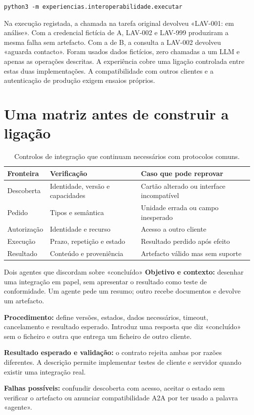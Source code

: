 \begin{lstlisting}
python3 -m experiencias.interoperabilidade.executar
\end{lstlisting}

Na execução registada, a chamada na tarefa original devolveu «LAV-001: em análise». Com a credencial fictícia de A, LAV-002 e LAV-999 produziram a mesma falha sem artefacto. Com a de B, a consulta a LAV-002 devolveu «aguarda contacto». Foram usados dados fictícios, zero chamadas a um LLM e apenas as operações descritas. A experiência cobre uma ligação controlada entre estas duas implementações. A compatibilidade com outros clientes e a autenticação de produção exigem ensaios próprios.

\section{Uma matriz antes de construir a ligação}
\begin{table}[htbp]
\small
\begin{tabularx}{\textwidth}{@{}lXX@{}}
\toprule
Fronteira & Verificação & Caso que pode reprovar \\
\midrule
Descoberta & Identidade, versão e capacidades & Cartão alterado ou interface incompatível \\
Pedido & Tipos e semântica & Unidade errada ou campo inesperado \\
Autorização & Identidade e recurso & Acesso a outro cliente \\
Execução & Prazo, repetição e estado & Resultado perdido após efeito \\
Resultado & Conteúdo e proveniência & Artefacto válido mas sem suporte \\
\bottomrule
\end{tabularx}
\caption{Controlos de integração que continuam necessários com protocolos comuns.}
\end{table}

\begin{promptlabbox}{Dois agentes que discordam sobre «concluído»}
\textbf{Objetivo e contexto:} desenhar uma integração em papel, sem apresentar o resultado como teste de conformidade. Um agente pede um resumo; outro recebe documentos e devolve um artefacto.

\textbf{Procedimento:} define versões, estados, dados necessários, timeout, cancelamento e resultado esperado. Introduz uma resposta que diz «concluído» sem o ficheiro e outra que entrega um ficheiro de outro cliente.

\textbf{Resultado esperado e validação:} o contrato rejeita ambas por razões diferentes. A descrição permite implementar testes de cliente e servidor quando existir uma integração real.

\textbf{Falhas possíveis:} confundir descoberta com acesso, aceitar o estado sem verificar o artefacto ou anunciar compatibilidade A2A por ter usado a palavra «agente».
\end{promptlabbox}
